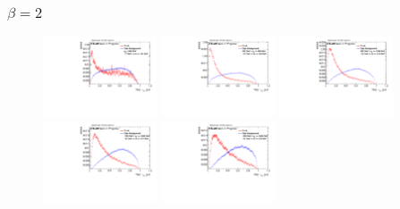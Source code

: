 \subsubsection*{$\beta=2$}
\begin{figure}[H]
\includegraphics[width=0.3\textwidth]{sascha_input/Appendix/Distributions/top/distributions/beta2/h_assisted_tj_nSub32_2_bin1.pdf} \hspace{1mm}
\includegraphics[width=0.3\textwidth]{sascha_input/Appendix/Distributions/top/distributions/beta2/h_assisted_tj_nSub32_2_bin2.pdf} \hspace{1mm}
\includegraphics[width=0.3\textwidth]{sascha_input/Appendix/Distributions/top/distributions/beta2/h_assisted_tj_nSub32_2_bin3.pdf} 
\bigskip
\includegraphics[width=0.3\textwidth]{sascha_input/Appendix/Distributions/top/distributions/beta2/h_assisted_tj_nSub32_2_bin4.pdf} \hspace{1mm}
\includegraphics[width=0.3\textwidth]{sascha_input/Appendix/Distributions/top/distributions/beta2/h_assisted_tj_nSub32_2_bin5.pdf} \hspace{1mm}

\end{figure}

